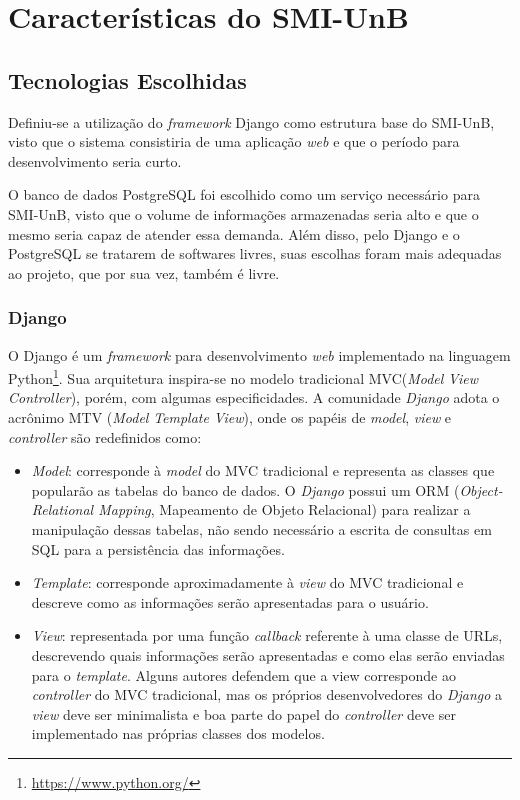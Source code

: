 \chapter{Características do SMI-UnB}

\section{Tecnologias Escolhidas}
Definiu-se a utilização do \textit{framework} Django \cite{django_project} como estrutura base do SMI-UnB, visto que o sistema consistiria de uma aplicação \textit{web} e que o período para desenvolvimento seria curto.

O banco de dados PostgreSQL foi escolhido como um serviço necessário para SMI-UnB, visto que o volume de informações armazenadas seria alto e que o mesmo seria capaz de atender essa demanda. Além disso, pelo Django e o PostgreSQL se tratarem de softwares livres, suas escolhas foram mais adequadas ao projeto, que por sua vez, também é livre.

    \subsection{Django}
    O Django  é um \textit{framework} para desenvolvimento \textit{web} implementado na linguagem Python\footnote{\url{https://www.python.org/}}. Sua arquitetura inspira-se no modelo tradicional MVC(\textit{Model} \textit{View} \textit{Controller}), porém, com algumas especificidades. A comunidade \textit{Django} adota o acrônimo MTV (\textit{Model} \textit{Template} \textit{View}), onde os papéis de \textit{model}, \textit{view} e \textit{controller} são redefinidos como:
    \begin{itemize}
        \item \textit{Model}: corresponde à \textit{model} do MVC tradicional e representa as classes que popularão as tabelas do banco de dados. O \textit{Django} possui um ORM (\textit{Object-Relational Mapping}, Mapeamento de Objeto Relacional) para realizar a manipulação dessas tabelas, não sendo necessário a escrita de consultas em SQL para a persistência das informações.
        \item \textit{Template}: corresponde aproximadamente à \textit{view} do MVC tradicional e descreve como as informações serão apresentadas para o usuário.
        \item \textit{View}: representada por uma função \textit{callback} referente à uma classe de URLs, descrevendo quais informações serão apresentadas e como elas serão enviadas para o \textit{template}. Alguns autores defendem que a view corresponde ao \textit{controller} do MVC tradicional, mas os próprios desenvolvedores do \textit{Django} a \textit{view} deve ser minimalista e boa parte do papel do \textit{controller} deve ser implementado nas próprias classes dos modelos.
    \end{itemize}

